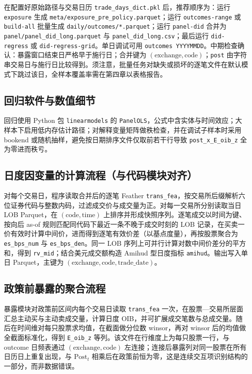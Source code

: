 \documentclass[UTF8, a4paper, 12pt]{ctexart}
\newcommand{\id}[1]{{\footnotesize\nolinkurl{#1}}}
\begin{document}
在配置好原始路径与交易日历 \id{trade_days_dict.pkl} 后，推荐顺序为：运行 \id{exposure} 生成 \id{meta/exposure_pre_policy.parquet}；运行 \id{outcomes-range} 或 \id{build-all} 批量生成 \id{daily/outcomes/*.parquet}；运行 \id{panel-did} 合并为 \id{panel/panel_did_long.parquet} 与 \id{panel_did_long.csv}；最后运行 \id{did-regress} 或 \id{did-regress-grid}。单日调试可用 \id{outcomes YYYYMMDD}。中期检查确认：暴露窗口结束日严格早于施行日；合并键为 \((\text{exchange}, \text{code})\)；\id{post} 由字符串交易日与施行日比较得到。须注意，批量任务对缺失或损坏的逐笔文件在默认模式下跳过该日，全样本覆盖率需在第四章以表格报告。

\subsection{回归软件与数值细节}

回归使用 Python 包 \id{linearmodels} 的 \id{PanelOLS}，公式中含实体与时间效应；大样本下启用低内存估计路径；对解释变量矩阵做秩检查，并在调试子样本时采用 bookend 或随机抽样，避免按日期排序文件仅取前若干行导致 \id{post_x_E_oib_z} 全为零进而秩亏。

\subsection{日度因变量的计算流程（与代码模块对齐）}

对每个交易日，程序读取合并后的逐笔 Feather \id{trans_fea}，按交易所后缀解析六位证券代码与整数内码，过滤成交价与成交量为正。对每一交易所分别读取当日 LOB Parquet，在 \((\text{code}, \text{time})\) 上排序并形成快照序列。逐笔成交以时间为键、按向后 as-of 规则匹配同代码下最近一条不晚于成交时刻的 LOB 记录，在买卖一价有效时计算中间价，进而得到逐笔有效价差（以基点度量），再按股票聚合为 \id{es_bps_num} 与 \id{es_bps_den}。同一 LOB 序列上可并行计算对数中间价差分的平方和，得到 \id{rv_mid}；结合美元成交额构造 Amihud 型日度指标 \id{amihud}。输出写入单日 Parquet，主键为 \((\text{exchange}, \text{code}, \text{trade\_date})\)。

\subsection{政策前暴露的聚合流程}

暴露模块对政策前区间内每个交易日读取 \id{trans_fea} 一次，在股票—交易所层面汇总主动买与主动卖成交量，计算日度 OIB，并可扩展成交笔数与总成交量。随后在时间维对每只股票求均值，在截面做分位数 winsor，再对 winsor 后的均值做全截面标准化，得到 \id{E_oib_z} 等列。该文件在行维度上为每只股票一行，与 outcome 日频表通过 \((\text{exchange}, \text{code})\) 左连接；连接后暴露列对同一股票在所有日历日上重复出现，与 \(\mathrm{Post}_t\) 相乘后在政策前恒为零，这是连续交互项识别结构的一部分，而非数据错误。
\end{document}
